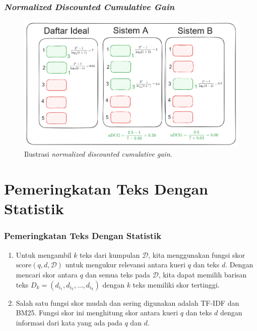 \documentclass[10pt]{beamer}
\newcommand{\f}[1]{\textit{#1}}
\begin{document}
\begin{frame}
    \frametitle{\f{Normalized Discounted Cumulative Gain}}
    \begin{figure}[!ht]
        \centering
        \includegraphics[width=1\textwidth]{assets/pics/contohnDCG.png}
        \caption{Ilustrasi \f{normalized discounted cumulative gain}.}
        \label{fig:ndcg}
    \end{figure}
\end{frame}

\section{Pemeringkatan Teks Dengan Statistik}

\begin{frame}
    \frametitle{{Pemeringkatan Teks Dengan Statistik}}

    \begin{enumerate}
        \item Untuk mengambil $k$ teks dari kumpulan $\mathcal{D}$, kita menggunakan fungsi skor $\text{score}(q, d, \mathcal{D})$ untuk mengukur relevansi antara kueri $q$ dan teks $d$. Dengan mencari skor antara $q$ dan semua teks pada $\mathcal{D}$, kita dapat memilih barisan teks $D_k = (d_{i_1}, d_{i_2},\dots, d_{i_k})$ dengan $k$ teks memiliki skor tertinggi.
        \item Salah satu fungsi skor mudah dan sering digunakan adalah TF-IDF dan BM25. Fungsi skor ini menghitung skor antara kueri $q$ dan teks $d$ dengan informasi dari kata yang ada pada $q$ dan $d$.
    \end{enumerate}
\end{frame}
\end{document}
